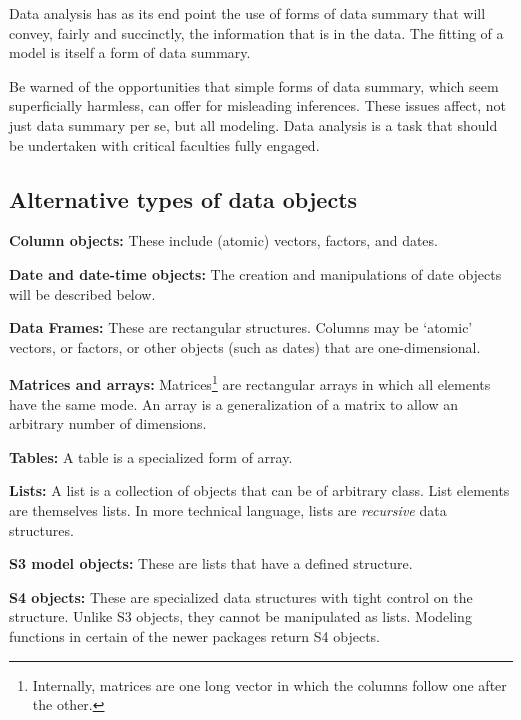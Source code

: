 






Data analysis has as its end point the use of forms of data summary
that will convey, fairly and succinctly, the information that is in
the data.  The fitting of a model is itself a form of data summary.

Be warned of
the opportunities that simple forms of data summary, which seem
superficially harmless, can offer for misleading inferences.  These
issues affect, not just data summary per se, but all modeling.  Data
analysis is a task that should be undertaken with critical
faculties fully engaged.

\subsection*{Alternative types of data objects}

\begin{trivlist}
\item[{\bf Column objects:}] These include (atomic) vectors,
factors, and dates.
\item[{\bf Date and date-time objects:}] The creation and
manipulations of date objects will be described below.
\item[{\bf Data Frames:}] These are rectangular structures.
    Columns may be `atomic' vectors, or
  factors, or other objects (such as dates) that are one-dimensional.
\item[{\bf Matrices and arrays:}] Matrices\footnote{Internally,
    matrices are one long vector in which the columns follow one after
    the other.} are rectangular arrays in which all elements have the
  same mode.  An array is a generalization of a matrix to allow
an arbitrary number of dimensions.
\item[{\bf Tables:}]  A table is a specialized form of array.
\item[{\bf Lists:}] A list is a collection of objects that can be of
  arbitrary class. List elements are themselves lists.  In
    more technical language, lists are {\em recursive} data structures.
\item[{\bf S3 model objects:}] These are lists that have a defined
  structure.
\item[{\bf S4 objects:}] These are specialized data structures with
  tight control on the structure. Unlike S3 objects, they cannot be
  manipulated as lists.  Modeling functions in certain of the newer
  packages return S4 objects.
\end{trivlist}

